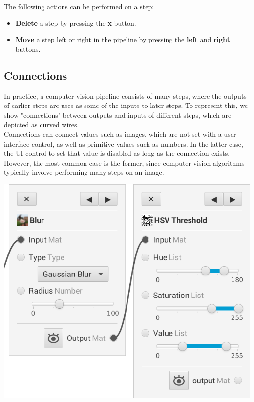 \documentclass[12pt]{article}
\begin{document}
The following actions can be performed on a step:
\begin{itemize}
    \item \textbf{Delete} a step by pressing the \textbf{x} button.
    \item \textbf{Move} a step left or right in the pipeline by pressing the \textbf{left} and \textbf{right} buttons.
\end{itemize}

\subsection{Connections}
In practice, a computer vision pipeline consists of many steps, where the outputs of earlier steps are uses as some of the inputs to later steps.  To represent this, we show "connections" between outputs and inputs of different steps, which are depicted as curved wires.\\

Connections can connect values such as images, which are not set with a user interface control, as well as primitive values such as numbers.  In the latter case, the UI control to set that value is disabled as long as the connection exists.  However, the most common case is the former, since computer vision algorithms typically involve performing many steps on an image.\\[0.5 cm]

\centerline{
    \includegraphics[scale = 0.5]{connection.png}
}
\end{document}
